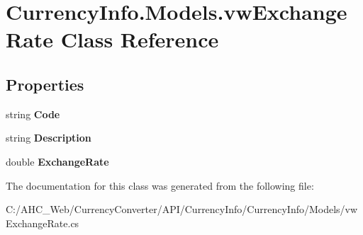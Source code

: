 \hypertarget{class_currency_info_1_1_models_1_1vw_exchange_rate}{\section{Currency\-Info.\-Models.\-vw\-Exchange\-Rate Class Reference}
\label{class_currency_info_1_1_models_1_1vw_exchange_rate}
}
\subsection*{Properties}
\begin{DoxyCompactItemize}
\item 
\hypertarget{class_currency_info_1_1_models_1_1vw_exchange_rate_ab2534146732b700256ab10414c34cd87}{string {\bfseries Code}}\label{class_currency_info_1_1_models_1_1vw_exchange_rate_ab2534146732b700256ab10414c34cd87}

\item 
\hypertarget{class_currency_info_1_1_models_1_1vw_exchange_rate_a30532fbc093b340f9594821cd04977ab}{string {\bfseries Description}}\label{class_currency_info_1_1_models_1_1vw_exchange_rate_a30532fbc093b340f9594821cd04977ab}

\item 
\hypertarget{class_currency_info_1_1_models_1_1vw_exchange_rate_adc8d1115c9439a20ee8aad16f3c5c3a1}{double {\bfseries Exchange\-Rate}}\label{class_currency_info_1_1_models_1_1vw_exchange_rate_adc8d1115c9439a20ee8aad16f3c5c3a1}

\end{DoxyCompactItemize}


The documentation for this class was generated from the following file\-:\begin{DoxyCompactItemize}
\item 
C\-:/\-A\-H\-C\-\_\-\-Web/\-Currency\-Converter/\-A\-P\-I/\-Currency\-Info/\-Currency\-Info/\-Models/vw\-Exchange\-Rate.\-cs\end{DoxyCompactItemize}

